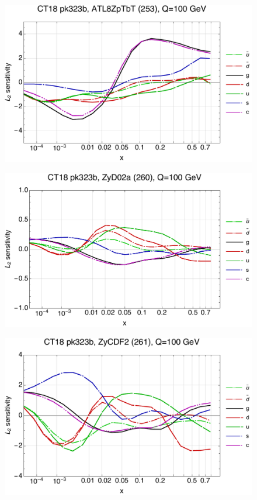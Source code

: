\documentclass[10pt,aps,prd,floatfix,titlepage]{revtex4}
\begin{document}
\clearpage
\begin{figure}
\includegraphics[width=\textwidth,height=0.44\textheight,keepaspectratio]{1/253_ct18nn_L2_q100_Sf_1.pdf}
\caption{}
\end{figure}
\begin{figure}
\includegraphics[width=\textwidth,height=0.44\textheight,keepaspectratio]{1/260_ct18nn_L2_q100_Sf_1.pdf}
\caption{}
\end{figure}
\clearpage
\begin{figure}
\includegraphics[width=\textwidth,height=0.44\textheight,keepaspectratio]{1/261_ct18nn_L2_q100_Sf_1.pdf}
\caption{}
\end{figure}
\end{document}
